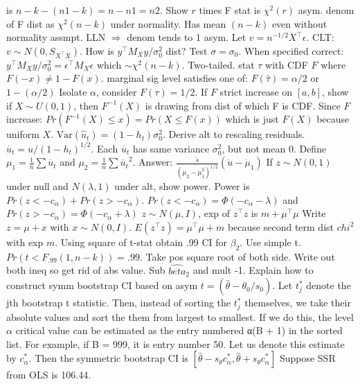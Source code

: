 is $n − k − (n1 − k) = n − n1 = n2$.
\Q Show $r$ times F stat is $\chi^2(r)$ asym.
\A denom of F dist as $\chi^2 (n-k)$ under normality.
Has mean $(n-k)$ even without normality assmpt.
LLN $\Rightarrow$ denom tends to 1 asym.
Let $v = n^{-1/2}X^{\top} \epsilon$.
CLT: $v \sim N(0, S_{X^{\top}X})$.
\Q How is $y^{\top} M_{X} y / \sigma_{0}^2$ dist?
Test $\sigma = \sigma_0$.
\A When specified correct: $y^{\top} M_{X} y / \sigma_{0}^2 = \epsilon^{\top} M_X \epsilon$ which $\sim \chi^2 (n-k)$.
Two-tailed.
\Q stat $\tau$ with CDF $F$ where $F(-x) \neq 1-F(x)$.
marginal sig level satisfies one of: $F(\hat{\tau}) = \alpha / 2$ or $1 - (\alpha / 2)$
Isolate $\alpha$, consider $F(\tau) = 1/2$.
\Q If $F$ strict increase on $[a,b]$, show if $X \sim U(0,1)$, then $F^{-1} (X)$ is drawing from dist of which F is CDF.
\A Since $F$ increase: $Pr(F^{-1} (X) \leq x) = Pr(X \leq F(x))$ which is just $F(X)$ because uniform $X$.
\Q $\text{Var} (\hat{u}_t) = (1-h_t)\sigma_0 ^2$.
Derive alt to rescaling residuals.
\A $\dot{u_t} = \hat{u} / (1-h_t)^{1/2}$.
Each $\dot{u_t}$ has same variance $\sigma_0 ^2$, but not mean 0.
Define $\mu_1 = \frac{1}{n} \sum \dot{u_t}$ and $\mu_2 = \frac{1}{n} \sum \dot{u_t}^2$.
Answer: $\frac{\tilde{s}}{(\dot{\mu}_2 - \dot{\mu}_1 ^2)^{1/2}} (\dot{u} - \dot{\mu}_1)$
\Q If $z \sim N(0,1)$ under null and $N(\lambda, 1)$ under alt, show power.
\A Power is $Pr(z < -c_{\alpha}) + Pr(z > -c_{\alpha})$.
$Pr(z < -c_{\alpha}) = \Phi (-c_{\alpha} - \lambda)$ and $Pr(z > -c_{\alpha}) = \Phi (-c_{\alpha} + \lambda)$
\Q $z \sim N(\mu, I)$, exp of $z^{\top}z$ is $m + \mu^{\top}\mu$
\A Write $z = \mu + x$ with $x \sim N(0,I)$.
$E(z^{\top}z) = \mu^{\top} \mu + m$ because second term dist $chi^2$ with exp $m$.
\Q Using square of t-stat obtain .99 CI for $\beta_2$.
\A Use simple t. $Pr ( t < F_{.99} (1,n-k) ) = .99$.
Take pos square root of both side.
Write out both ineq so get rid of abs value.
Sub $\hat{beta}_2$ and mult -1.
\Q Explain how to construct symm bootstrap CI based on asym $t = (\hat{\theta} - \theta_0 / s_0)$.
\A Let $t^{\ast}_j$ denote the jth bootstrap t statistic.
Then, instead of sorting the $t^{\ast}_j$ themselves, we take their absolute values and sort the them from largest to smallest.
If we do this, the level $\alpha$ critical value can be estimated as the entry numbered α(B + 1) in the sorted list.
For example, if B = 999, it is entry number 50.
Let us denote this estimate by $c^{\ast}_{\alpha}$.
Then the symmetric bootstrap CI is $[\hat{\theta} - s_{\theta} c_{\alpha}^{\ast}, \hat{\theta} + s_{\theta} c^{\ast}_{\alpha}]$
\Q Suppose SSR from OLS is 106.44.
